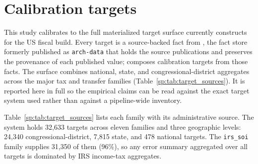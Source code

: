 \appendix

\section{Calibration targets}
\label{sp:app:targets}

This study calibrates to the full materialized target surface \populace{} currently constructs for the
US fiscal build. Every target is a source-backed fact from \policyengine{} \chronicle{} \citep{ledger2026},
the \chronicle{} fact store formerly published as \texttt{arch-data} that holds the source publications and
preserves the provenance of each published value; \populace{} composes calibration targets from those facts. The surface combines national,
state, and congressional-district aggregates across the major tax and transfer families
(Table~\ref{sp:tab:target_sources}). It is reported here in full so the empirical claims can be read against
the exact target system used rather than against a pipeline-wide inventory.

Table~\ref{sp:tab:target_sources} lists each family with its administrative source. The system holds
32{,}633 targets across eleven families and three geographic levels: 24{,}340 congressional-district,
7{,}815 state, and 478 national targets. The \texttt{irs\_soi} family supplies 31{,}350 of them (96\%),
so any error summary aggregated over all targets is dominated by IRS income-tax aggregates.

